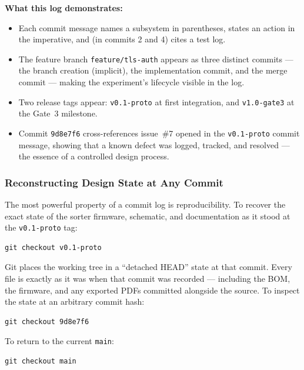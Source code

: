 \noindent\textbf{What this log demonstrates:}
\begin{itemize}
  \item Each commit message names a subsystem in parentheses, states an action in the
        imperative, and (in commits 2 and 4) cites a test log.
  \item The feature branch \texttt{feature/tls-auth} appears as three distinct commits ---
        the branch creation (implicit), the implementation commit, and the merge commit ---
        making the experiment's lifecycle visible in the log.
  \item Two release tags appear: \texttt{v0.1-proto} at first integration, and
        \texttt{v1.0-gate3} at the Gate~3 milestone.
  \item Commit \texttt{9d8e7f6} cross-references issue~\#7 opened in the
        \texttt{v0.1-proto} commit message, showing that a known defect was logged,
        tracked, and resolved --- the essence of a controlled design process.
\end{itemize}

\subsubsection{Reconstructing Design State at Any Commit}
\label{subsubsec:ch13-checkout}

The most powerful property of a commit log is
reproducibility.
To recover the exact state of the sorter firmware, schematic, and documentation as it
stood at the \texttt{v0.1-proto} tag:

\begin{verbatim}
git checkout v0.1-proto
\end{verbatim}

\noindent Git places the working tree in a ``detached HEAD'' state at that commit.
Every file is exactly as it was when that commit was recorded --- including the BOM, the
firmware, and any exported PDFs committed alongside the source.
To inspect the state at an arbitrary commit hash:

\begin{verbatim}
git checkout 9d8e7f6
\end{verbatim}

\noindent To return to the current \texttt{main}:

\begin{verbatim}
git checkout main
\end{verbatim}

